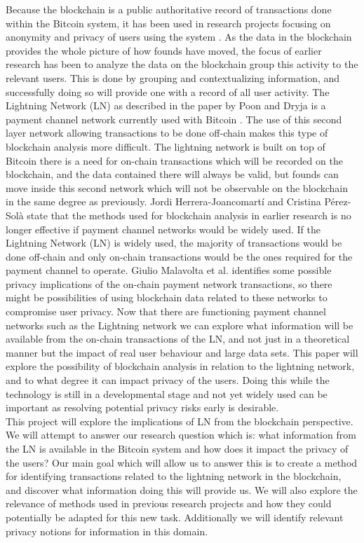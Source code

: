 Because the blockchain is a public authoritative record of transactions done within the Bitcoin system, it has been used in research projects focusing on anonymity and privacy of users using the system \cite{reid2013analysis} \cite{meiklejohn2013fistful}. As the data in the blockchain provides the whole picture of how founds have moved, the focus of earlier research has been to analyze the data on the blockchain group this activity to the relevant users. This is done by grouping and contextualizing information, and successfully doing so will provide one with a record of all user activity. 
The Lightning Network (LN) as described in the paper by Poon and Dryja \cite{poon2015bitcoin} is a payment channel network currently used with Bitcoin . The use of this second layer network allowing transactions to be done off-chain makes this type of blockchain analysis more difficult. The lightning network is built on top of Bitcoin there is a need for on-chain transactions which will be recorded on the blockchain, and the data contained there will always be valid, but founds can move inside this second network which will not be observable on the blockchain in the same degree as previously. Jordi Herrera-Joancomartí and Cristina Pérez-Solà \cite{herrera2015research} state that the methods used for blockchain analysis in earlier research is no longer effective if payment channel networks would be widely used. If the Lightning Network (LN) is widely used, the majority of transactions would be done off-chain and only on-chain transactions would be the ones required for the payment channel to operate. Giulio Malavolta et al. \cite{malavolta2017concurrency} identifies some possible privacy implications of the on-chain payment network transactions, so there might be possibilities of using blockchain data related to these networks to compromise user privacy. Now that there are functioning payment channel networks such as the Lightning network we can explore what information will be available from the on-chain transactions of the LN, and not just in a theoretical manner but the impact of real user behaviour and large data sets. This paper will explore the possibility of blockchain analysis in relation to the lightning network, and to what degree it can impact privacy of the users. Doing this while the technology is still in a developmental stage and not yet widely used can be important as resolving potential privacy risks early is desirable.
\\

This project will explore the implications of LN from the blockchain perspective.
We will attempt to answer our research question which is: what information from the LN is available in the Bitcoin system and how does it impact the privacy of the users?
Our main goal which will allow us to answer this is to create a method for identifying transactions related to the lightning network in the blockchain, and discover what information doing this will provide us.
We will also explore the relevance of methods used in previous research projects and how they could potentially be adapted for this new task. Additionally we will identify relevant privacy notions for information in this domain.

